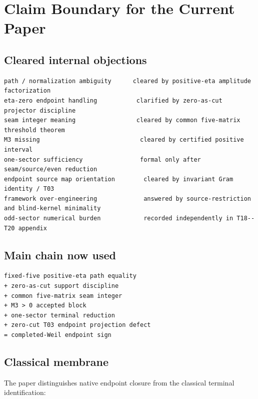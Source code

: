 \hypertarget{claim-boundary-for-the-current-paper}{%
\chapter{Claim Boundary for the Current Paper}\label{claim-boundary-for-the-current-paper}}

\hypertarget{cleared-internal-objections}{%
\section{Cleared internal objections}\label{cleared-internal-objections}}

\begin{verbatim}
path / normalization ambiguity      cleared by positive-eta amplitude factorization
eta-zero endpoint handling           clarified by zero-as-cut projector discipline
seam integer meaning                 cleared by common five-matrix threshold theorem
M3 missing                            cleared by certified positive interval
one-sector sufficiency                formal only after seam/source/even reduction
endpoint source map orientation        cleared by invariant Gram identity / T03
framework over-engineering             answered by source-restriction and blind-kernel minimality
odd-sector numerical burden            recorded independently in T18--T20 appendix
\end{verbatim}

\hypertarget{main-chain-now-used}{%
\section{Main chain now used}\label{main-chain-now-used}}

\begin{verbatim}
fixed-five positive-eta path equality
+ zero-as-cut support discipline
+ common five-matrix seam integer
+ M3 > 0 accepted block
+ one-sector terminal reduction
+ zero-cut T03 endpoint projection defect
= completed-Weil endpoint sign
\end{verbatim}

\hypertarget{classical-membrane}{%
\section{Classical membrane}\label{classical-membrane}}

The paper distinguishes native endpoint closure from the classical terminal identification:

